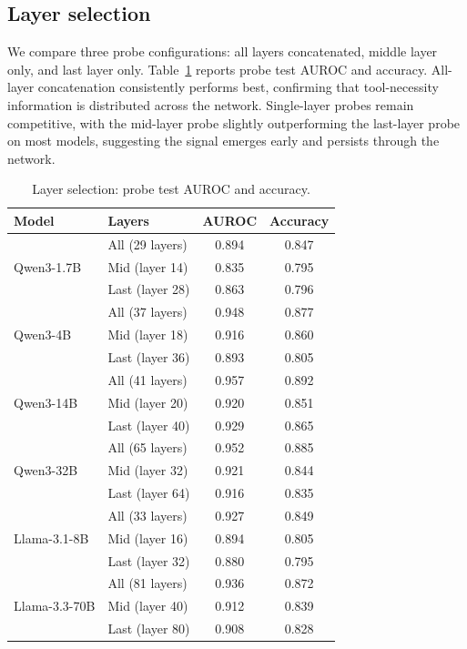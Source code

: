 \subsection{Layer selection}
\label{app:ablation_layer}

We compare three probe configurations: all layers concatenated, middle layer only, and last layer only. Table~\ref{tab:abl_layer} reports probe test AUROC and accuracy. All-layer concatenation consistently performs best, confirming that tool-necessity information is distributed across the network. Single-layer probes remain competitive, with the mid-layer probe slightly outperforming the last-layer probe on most models, suggesting the signal emerges early and persists through the network.

\begin{table}[H]
\caption{Layer selection: probe test AUROC and accuracy.}
\label{tab:abl_layer}
\centering
\small
\begin{tabular}{llcc}
\toprule
Model & Layers & AUROC & Accuracy \\
\midrule
\multirow{3}{*}{Qwen3-1.7B}
  & All (29 layers) & 0.894 & 0.847 \\
  & Mid (layer 14)  & 0.835 & 0.795 \\
  & Last (layer 28) & 0.863 & 0.796 \\
\midrule
\multirow{3}{*}{Qwen3-4B}
  & All (37 layers) & 0.948 & 0.877 \\
  & Mid (layer 18)  & 0.916 & 0.860 \\
  & Last (layer 36) & 0.893 & 0.805 \\
\midrule
\multirow{3}{*}{Qwen3-14B}
  & All (41 layers) & 0.957 & 0.892 \\
  & Mid (layer 20)  & 0.920 & 0.851 \\
  & Last (layer 40) & 0.929 & 0.865 \\
\midrule
\multirow{3}{*}{Qwen3-32B}
  & All (65 layers) & 0.952 & 0.885 \\
  & Mid (layer 32)  & 0.921 & 0.844 \\
  & Last (layer 64) & 0.916 & 0.835 \\
\midrule
\multirow{3}{*}{Llama-3.1-8B}
  & All (33 layers) & 0.927 & 0.849 \\
  & Mid (layer 16)  & 0.894 & 0.805 \\
  & Last (layer 32) & 0.880 & 0.795 \\
\midrule
\multirow{3}{*}{Llama-3.3-70B}
  & All (81 layers) & 0.936 & 0.872 \\
  & Mid (layer 40)  & 0.912 & 0.839 \\
  & Last (layer 80) & 0.908 & 0.828 \\
\bottomrule
\end{tabular}
\end{table}

